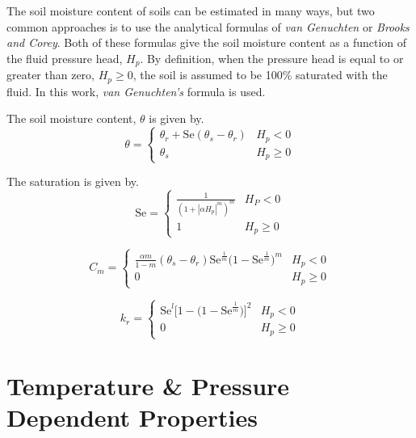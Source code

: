 \documentclass[../main.tex]{subfiles}
\begin{document}
The soil moisture content of soils can be estimated in many ways, but two common approaches is to use the analytical formulas of \textit{van Genuchten} or \textit{Brooks and Corey}.
Both of these formulas give the soil moisture content as a function of the fluid pressure head, $H_p$.
By definition, when the pressure head is equal to or greater than zero, $H_p \geq 0$, the soil is assumed to be 100\% saturated with the fluid.
In this work, \textit{van Genuchten's} formula is used.

The soil moisture content, $\theta$ is given by.
\begin{equation}
  \theta = \begin{cases}
    \theta_r + \mathrm{Se}(\theta_s - \theta_r) & H_p < 0 \\
    \theta_s & H_p \geq 0
\end{cases}
\end{equation}

The saturation is given by.
\begin{equation}
  \mathrm{Se} = \begin{cases}
    \frac{1}{(1 + |\alpha H_p|^m)^m} & H_P < 0 \\
    1 & H_p \geq 0
  \end{cases}
\end{equation}

\begin{equation}
  C_m = \begin{cases}
    \frac{\alpha m}{1-m}(\theta_s - \theta_r)\mathrm{Se}^{\frac{1}{m}}\big( 1 - \mathrm{Se}^{\frac{1}{m}} \big)^m & H_p < 0 \\
    0 & H_p \geq 0
  \end{cases}
\end{equation}

\begin{equation}
  k_r = \begin{cases}
    \mathrm{Se}^l \big[ 1 - \big( 1 - \mathrm{Se}^\frac{1}{m} \big) \big]^2 & H_p < 0 \\
    0 & H_p \geq 0
  \end{cases}
\end{equation}

\section{Temperature \& Pressure Dependent Properties}
\end{document}
